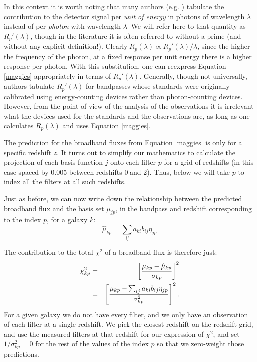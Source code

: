 \documentclass[10pt,preprint]{aastex}
\begin{document}
In this context it is worth noting that many authors
(e.g. \citealt{bessell90a}) tabulate the contribution to the detector
signal per {\it unit of energy} in photons of wavelength $\lambda$
instead of per {\it photon} with wavelength $\lambda$.  We will refer here
to that quantity as $R_p'(\lambda)$, though in the literature it is
often referred to without a prime (and without any explicit
definition!). Clearly $R_p(\lambda) \propto R_p'(\lambda)/\lambda$,
since the higher the frequency of the photon, at a fixed response per
unit energy there is a higher response per photon. With this
substitution, one can reexpress Equation
\ref{maggies} appropriately in terms of $R_p'(\lambda)$.  
Generally, though not universally, authors tabulate $R_p'(\lambda)$
for bandpasses whose standards were originally calibrated using
energy-counting devices rather than photon-counting devices. However,
from the point of view of the analysis of the observations it is
irrelevant what the devices used for the standards and the
observations are, as long as one calculates $R_p(\lambda)$ and uses
Equation \ref{maggies}.  

The prediction for the broadband fluxes from Equation
\ref{maggies} is only for a specific redshift $z$. It turns out to
simplify our mathematics to calculate the projection of each basis
function $j$ onto each filter $p$ for a grid of redshifts (in this
case spaced by 0.005 between redshifts 0 and 2). Thus, below we will
take $p$ to index all the filters at all such redshifts.

Just as before, we can now write down the relationship between the
predicted broadband flux and the basis set $\mu_{jp}$, in the bandpass
and redshift corresponding to the index $p$, for a galaxy $k$:
\begin{equation}
\hat{\mu}_{kp} = \sum_{ij} a_{ki} b_{ij} \eta_{jp}
\end{equation}

The contribution to the total $\chi^2$ of a broadband flux is
therefore just:
\begin{eqnarray}
\label{chi2photo}
\chi^2_{kp} &=& \left[\frac{\mu_{kp} - \hat\mu_{kp}}
{\sigma_{kp}}\right]^2 \cr
&=&
\left[\frac{\mu_{kp} -
\sum_{ij} a_{ki} b_{ij} \eta_{jp}
}{\sigma^2_{kp}}\right]^2. 
\end{eqnarray}
For a given galaxy we do not have every filter, and we only have an
observation of each filter at a single redshift. We pick the closest
redshift on the redshift grid, and use the measured filters at that
redshift for our expression of $\chi^2$, and set $1/\sigma_{kp}^2 = 0$
for the rest of the values of the index $p$ so that we zero-weight
those predictions.
\end{document}

